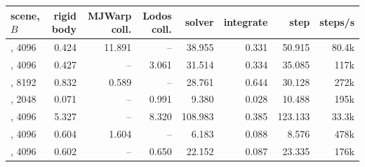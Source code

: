 \begin{tabularx}{\linewidth}{@{}Yrrrrrrr@{}}
\toprule
scene, $B$ & rigid body & MJWarp coll. & Lodos coll. & solver & integrate & step & steps/s \\
\midrule
{}, 4096 & 0.424 & 11.891 & -- & 38.955 & 0.331 & 50.915 & 80.4k \\
, 4096 & 0.427 & -- & 3.061 & 31.514 & 0.334 & 35.085 & 117k \\
, 8192 & 0.832 & 0.589 & -- & 28.761 & 0.644 & 30.128 & 272k \\
, 2048 & 0.071 & -- & 0.991 & 9.380 & 0.028 & 10.488 & 195k \\
, 4096 & 5.327 & -- & 8.320 & 108.983 & 0.385 & 123.133 & 33.3k \\
, 4096 & 0.604 & 1.604 & -- & 6.183 & 0.088 & 8.576 & 478k \\
, 4096 & 0.602 & -- & 0.650 & 22.152 & 0.087 & 23.335 & 176k \\
\bottomrule
\end{tabularx}
